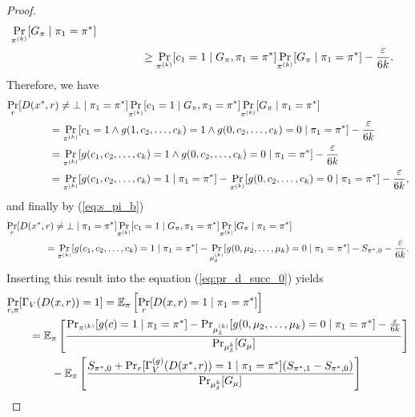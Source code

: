 \begin{proof}
\begin{align}
  \underset{\pi^{(k)}}{\Pr}[G_{\pi} \mid \pi_1 = \pi^*] \notag\\
  &\mbox\qquad\qquad \geq \underset{\pi^{(k)}}{\Pr}[c_1 = 1 \mid G_{\pi}, \pi_1 = \pi^*]\underset{\pi^{(k)}}{\Pr}[G_{\pi} \mid \pi_1 = \pi^*] - \frac{\varepsilon}{6k}.
\end{align}
Therefore, we have
\begin{align*}
  &\underset{r}{\Pr}[D(x^*,r) \neq \bot \mid \pi_1 = \pi^*]
  \underset{\pi^{(k)}}{\Pr}[c_1 = 1 \mid G_{\pi}, \pi_1 = \pi^*]
  \underset{\pi^{(k)}}{\Pr}[G_{\pi} \mid \pi_1 = \pi^*] \notag\\
  &\mbox\qquad\qquad = \underset{\pi^{(k)}}{\Pr}[c_1 = 1 \land g(1, c_2,\dots, c_k) = 1 \land g(0, c_2, \dots, c_k) = 0 \mid \pi_1 = \pi^*] - \frac{\varepsilon}{6k} \\
  &\mbox\qquad\qquad = \underset{\pi^{(k)}}{\Pr}[g(c_1, c_2,\dots, c_k) = 1 \land g(0, c_2, \dots, c_k) = 0 \mid \pi_1 = \pi^*] - \frac{\varepsilon}{6k} \\
  &\mbox\qquad\qquad = \underset{\pi^{(k)}}{\Pr}[g(c_1, c_2,\dots, c_k) = 1 \mid \pi_1 = \pi^*] -  \underset{\pi^{(k)}}{\Pr}[g(0, c_2, \dots, c_k) = 0 \mid \pi_1 = \pi^*] - \frac{\varepsilon}{6k},
\end{align*}
and finally by (\ref{eq:s_pi_b})
\begin{align}
  &\underset{r}{\Pr}[D(x^*,r) \neq \bot \mid \pi_1 = \pi^*]
  \underset{\pi^{(k)}}{\Pr}[c_1 = 1 \mid G_{\pi}, \pi_1 = \pi^*]
  \underset{\pi^{(k)}}{\Pr}[G_{\pi} \mid \pi_1 = \pi^*] \notag\\
  &\mbox\qquad\qquad = \underset{\pi^{(k)}}{\Pr}[g(c_1, c_2,\dots, c_k) = 1 \mid \pi_1 = \pi^*] -  \underset{\mu_{\delta}^{(k)}}{\Pr}[g(0, \mu_2, \dots, \mu_k) = 0 \mid \pi_1 = \pi^*]  - S_{\pi^*,0} - \frac{\varepsilon}{6k}.
\end{align}
Inserting this result into the equation (\ref{eq:pr_d_succ_0}) yields
\begin{align}
\label{eq:pr_d_succ_1}
  &\underset{r,\pi}{\Pr}[\Gamma_V(D(x,r)) = 1] = \mathbb{E_{\pi}}\left[\underset{r}{\Pr}[D(x,r) = 1 \mid \pi_1 = \pi^*]\right] \notag\\
&\mbox\qquad = \mathbb{E}_{\pi}\left[\frac{{\Pr}_{\pi^{(k)}}[g(c) = 1 \mid \pi_1 = \pi^*] -
{\Pr}_{\mu_{\delta}^{(k)}}[g(0, \mu_2, \dots, \mu_k) = 0 \mid \pi_1 = \pi^*] - \frac{\varepsilon}{6k}} {{\Pr}_{\mu_{\delta}^{k}}[G_{\mu}]}\right] \notag\\
&\mbox\qquad\qquad - \mathbb{E}_{\pi}\left[\frac{
  S_{\pi^*,0} + \Pr_r [\Gamma_V^{(g)}(D(x^*,r)) = 1 \mid \pi_1 = \pi^*](S_{\pi^*,1} - S_{\pi^*,0})}
{{\Pr}_{\mu_{\delta}^{k}}[G_{\mu}]}\right]
\end{align}

\end{proof}
